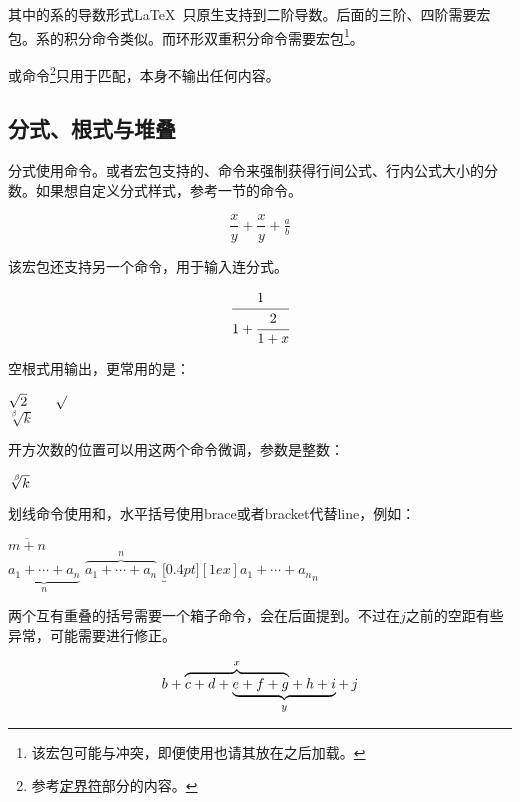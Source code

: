 其中的系的导数形式\LaTeX\ 只原生支持到二阶导数。后面的三阶、四阶需要宏包。系的积分命令类似。而环形双重积分命令需要宏包\footnote{该宏包可能与冲突，即便使用也请其放在之后加载。}。

或命令\footnote{参考\hyperref[subsec:delimiter]{定界符}部分的内容。}只用于匹配，本身不输出任何内容。

\subsection{分式、根式与堆叠}
分式使用命令。或者宏包支持的、命令来强制获得行间公式、行内公式大小的分数。如果想自定义分式样式，参考一节的命令。
\begin{codeshow}
\[\frac{x}{y}+\dfrac{x}{y}
+\tfrac{a}{b}\]
\end{codeshow}

该宏包还支持另一个命令，用于输入连分式。
\begin{codeshow}
\[\cfrac{1}{1+\cfrac{2}{1+x}}\]
\end{codeshow}

空根式用输出，更常用的是：
\begin{codeshow}
$\sqrt{2} \qquad \surd$\\
$\sqrt[\beta]{k}$
\end{codeshow}

开方次数的位置可以用这两个命令微调，参数是整数：
\begin{codeshow}
$\sqrt[\leftroot{-2}\uproot{2} \beta]{k}$
\end{codeshow}

划线命令使用和，水平括号使用brace或者bracket代替line，例如：

\begin{codeshow}
$\overline{m+n}$ \\
$\underbrace{a_1+\cdots+a_n}_{n}$
$\overbrace{a_1+\cdots+a_n}^{n}$
$\underbracket[0.4pt][1ex]
  {a_1+\cdots+a_n}_n$
\end{codeshow}

两个互有重叠的括号需要一个箱子命令，会在后面提到。不过在$j$之前的空距有些异常，可能需要\latexline{,}进行修正。
\begin{codeshow}
\[b+\rlap{$\overbrace{\phantom{
  c+d+e+f+g}}^x$}c+d+\underbrace{
  e+f+g+h+i}_y+\,j \]
\end{codeshow}


